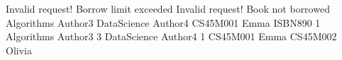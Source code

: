 Invalid request! Borrow limit exceeded
Invalid request! Book not borrowed
Algorithms Author3
DataScience Author4
CS45M001 Emma ISBN890 1
Algorithms Author3 3
DataScience Author4 1
CS45M001 Emma
CS45M002 Olivia